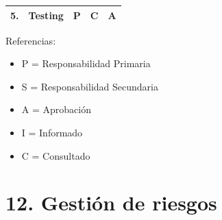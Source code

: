 \documentclass[11pt]{charter}
\begin{document}
\begin{table}[htbp]
\begin{tabular}{|c|c|c|c|c|}
5.                                                                                             & Testing                                                      & P                                                                                & C                                                                            & A                                                                             \\ \hline
\end{tabular}
\end{table}

{\footnotesize
Referencias:
\begin{itemize}
	\item P = Responsabilidad Primaria
	\item S = Responsabilidad Secundaria
	\item A = Aprobación
	\item I = Informado
	\item C = Consultado
\end{itemize}
} %


\section{12. Gestión de riesgos}
\label{sec:riesgos}
\end{document}
